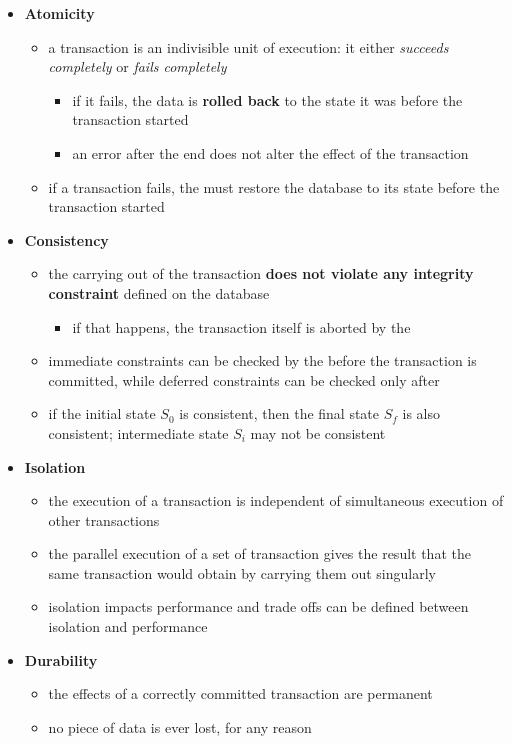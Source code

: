 \documentclass[english]{article}
\begin{document}
\begin{itemize}
  \item \textbf{Atomicity}
        \begin{itemize}
          \item a transaction is an indivisible unit of execution: it either \textit{succeeds completely} or \textit{fails completely}
                \begin{itemize}
                  \item if it fails, the data is \textbf{rolled back} to the state it was before the transaction started
                  \item an error after the end does not alter the effect of the transaction
                \end{itemize}
          \item if a transaction fails, the \DBMS must restore the database to its state before the transaction started
        \end{itemize}
  \item \textbf{Consistency}
        \begin{itemize}
          \item the carrying out of the transaction \textbf{does not violate any integrity constraint} defined on the database
                \begin{itemize}
                  \item if that happens, the transaction itself is aborted by the \DBMS
                \end{itemize}
          \item immediate constraints can be checked by the \DBMS before the transaction is committed, while deferred constraints can be checked only after
          \item if the initial state \(S_0\) is consistent, then the final state \(S_f\) is also consistent; intermediate state \(S_i\) may not be consistent
        \end{itemize}
  \item \textbf{Isolation}
        \begin{itemize}
          \item the execution of a transaction is independent of simultaneous execution of other transactions
          \item the parallel execution of a set of transaction gives the result that the same transaction would obtain by carrying them out singularly
          \item isolation impacts performance and trade offs can be defined between isolation and performance
        \end{itemize}
  \item \textbf{Durability}
        \begin{itemize}
          \item the effects of a correctly committed transaction are permanent
          \item no piece of data is ever lost, for any reason
        \end{itemize}
\end{itemize}
\end{document}
